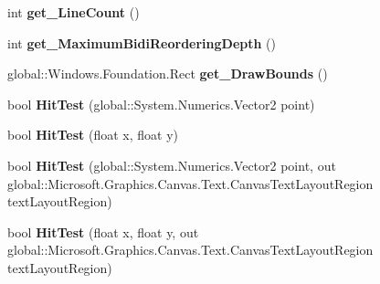 \begin{DoxyCompactItemize}
int {\bfseries get\+\_\+\+Line\+Count} ()
\item 
\mbox{\label{class_microsoft_1_1_graphics_1_1_canvas_1_1_text_1_1_canvas_text_layout_aac362a9384d9d8fa5cf235e2f129c939}} 
int {\bfseries get\+\_\+\+Maximum\+Bidi\+Reordering\+Depth} ()
\item 
\mbox{\label{class_microsoft_1_1_graphics_1_1_canvas_1_1_text_1_1_canvas_text_layout_a5230b0750a39afe10eab8898a0e65f82}} 
global\+::\+Windows.\+Foundation.\+Rect {\bfseries get\+\_\+\+Draw\+Bounds} ()
\item 
\mbox{\label{class_microsoft_1_1_graphics_1_1_canvas_1_1_text_1_1_canvas_text_layout_a096ba89ae4dafe4d7af99c68f87facb2}} 
bool {\bfseries Hit\+Test} (global\+::\+System.\+Numerics.\+Vector2 point)
\item 
\mbox{\label{class_microsoft_1_1_graphics_1_1_canvas_1_1_text_1_1_canvas_text_layout_abe577fdf1f6c6ac76801fb8eee342738}} 
bool {\bfseries Hit\+Test} (float x, float y)
\item 
\mbox{\label{class_microsoft_1_1_graphics_1_1_canvas_1_1_text_1_1_canvas_text_layout_acf6969a305076eb5ecd8ad98552ed8a5}} 
bool {\bfseries Hit\+Test} (global\+::\+System.\+Numerics.\+Vector2 point, out global\+::\+Microsoft.\+Graphics.\+Canvas.\+Text.\+Canvas\+Text\+Layout\+Region text\+Layout\+Region)
\item 
\mbox{\label{class_microsoft_1_1_graphics_1_1_canvas_1_1_text_1_1_canvas_text_layout_a39dc3babff6a75fb4e1468efdcf2ad6e}} 
bool {\bfseries Hit\+Test} (float x, float y, out global\+::\+Microsoft.\+Graphics.\+Canvas.\+Text.\+Canvas\+Text\+Layout\+Region text\+Layout\+Region)
\item 
\mbox{\label{class_microsoft_1_1_graphics_1_1_canvas_1_1_text_1_1_canvas_text_layout_a532b1b13e054c3c5b5547158050e3b94}} 

\end{DoxyCompactItemize}
